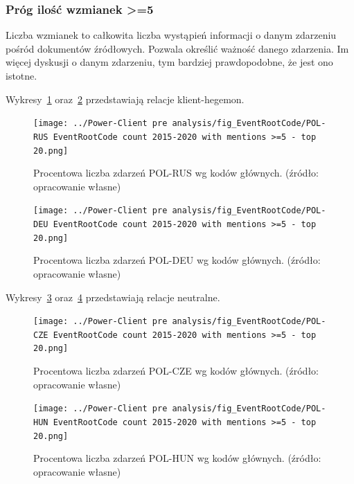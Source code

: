 \documentclass[11pt]{report}
\begin{document}
    \subsubsection{Próg ilość wzmianek >=5}\label{subsubsec:erc:próg-ilość-wzmianek->=5}
    Liczba wzmianek to całkowita liczba wystąpień informacji o danym zdarzeniu pośród dokumentów źródłowych.
    Pozwala określić ważność danego zdarzenia.
    Im więcej dyskusji o danym zdarzeniu, tym bardziej prawdopodobne, że jest ono istotne.

    Wykresy~\ref{fig:Power-Client:ERC:Mentions:POL-RUS} oraz~\ref{fig:Power-Client:ERC:Mentions:POL-DEU} przedstawiają relacje klient-hegemon.

    \begin{figure}[!htp]
        \centering
        \texttt{[image: ../Power-Client pre analysis/fig\_EventRootCode/POL-RUS EventRootCode count 2015-2020 with mentions >=5 - top 20.png]}
        \caption{Procentowa liczba zdarzeń POL-RUS wg kodów głównych. (źródło: opracowanie własne)}
        \label{fig:Power-Client:ERC:Mentions:POL-RUS}
    \end{figure}

    \begin{figure}[!htp]
        \centering
        \texttt{[image: ../Power-Client pre analysis/fig\_EventRootCode/POL-DEU EventRootCode count 2015-2020 with mentions >=5 - top 20.png]}
        \caption{Procentowa liczba zdarzeń POL-DEU wg kodów głównych. (źródło: opracowanie własne)}
        \label{fig:Power-Client:ERC:Mentions:POL-DEU}
    \end{figure}

    Wykresy~\ref{fig:Power-Client:ERC:Mentions:POL-CZE} oraz~\ref{fig:Power-Client:ERC:Mentions:POL-HUN} przedstawiają relacje neutralne.

    \begin{figure}[!htp]
        \centering
        \texttt{[image: ../Power-Client pre analysis/fig\_EventRootCode/POL-CZE EventRootCode count 2015-2020 with mentions >=5 - top 20.png]}
        \caption{Procentowa liczba zdarzeń POL-CZE wg kodów głównych. (źródło: opracowanie własne)}
        \label{fig:Power-Client:ERC:Mentions:POL-CZE}
    \end{figure}

    \begin{figure}[!htp]
        \centering
        \texttt{[image: ../Power-Client pre analysis/fig\_EventRootCode/POL-HUN EventRootCode count 2015-2020 with mentions >=5 - top 20.png]}
        \caption{Procentowa liczba zdarzeń POL-HUN wg kodów głównych. (źródło: opracowanie własne)}
        \label{fig:Power-Client:ERC:Mentions:POL-HUN}
    \end{figure}
\end{document}
